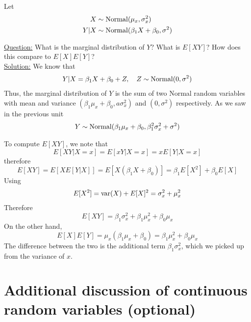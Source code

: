 
 \begin{example}\label{ex:firstreg}
Let
\begin{align*}
X &\sim {\rm Normal}(\mu_x,\sigma_x^2)\\
Y|X &\sim {\rm Normal}(\beta_1X + \beta_0,\sigma^2)
\end{align*}

 \noindent
\underline{Question:} What is the marginal distribution of $Y$? What is $E[XY]$? How does this compare to $E[X]E[Y]$?\\


 \noindent
\underline{Solution:} We know that 
\begin{equation*}
Y|X =\beta_1X+\beta_0 + Z,\quad Z \sim {\rm Normal}(0,\sigma^2)
\end{equation*}
Thus, the marginal distribution of $Y$ is the sum of two Normal random variables with mean and variance $(\beta_1\mu_x+\beta_0,a\sigma_x^2)$ and $(0,\sigma^2)$ respectively. As we saw in the previous unit
\begin{equation*}
Y  \sim {\rm Normal}(\beta_1\mu_x+\beta_0,\beta_1^2\sigma_x^2 + \sigma^2)
\end{equation*}

To compute $E[XY]$, we note that 
\begin{equation*}
E[XY|X=x]=  E[xY|X=x]= xE[Y|X=x]
\end{equation*}
therefore
\begin{equation*}
E[XY] = E[XE[Y|X]] = E[X(\beta_1X+\beta_0)] = \beta_1E[X^2]+\beta_0E[X]
\end{equation*}
Using 
\begin{equation*}
E[X^2] = {\rm var}(X) + E[X]^2 = \sigma_x^2 + \mu_x^2
\end{equation*}
Therefore 
\begin{equation*}
E[XY] =  \beta_1\sigma_x^2 + \beta_1\mu_x^2 + \beta_0\mu_x
\end{equation*}
On the other hand, 
\begin{equation*}
E[X]E[Y] = \mu_x(\beta_1\mu_x+\beta_0) = \beta_1 \mu_x^2 +\beta_0 \mu_x
\end{equation*}
The difference between the two is the additional term $\beta_1\sigma_x^2$, which we picked up from the variance of $x$.  


\end{example}

\appendix

 \section{Additional discussion of continuous random variables (optional)}


